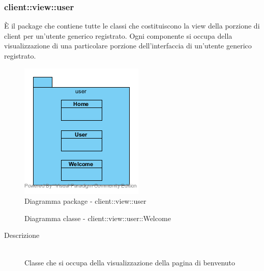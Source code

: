 \subsubsection{client::view::user}
È il package che contiene tutte le classi che costituiscono la view della porzione di client per un'utente generico registrato. Ogni componente si occupa della visualizzazione di una particolare porzione dell'interfaccia di un'utente generico registrato.\begin{center}
	\begin{figure}[H]
		\centering \includegraphics[scale=4, max width=\textwidth, max height=\myheight]{../img/diagrammiClassi/client/view/user.png}
		\caption{Diagramma package - client::view::user}
	\end{figure}
\end{center}\hypertarget{client::view::user::Welcome}{}
\begin{figure}[H]
	\centering
	\caption{Diagramma classe - client::view::user::Welcome}
\end{figure}\begin{description}
\item[Descrizione] \hfill \\
Classe che si occupa della visualizzazione della pagina di benvenuto
\end{description}


